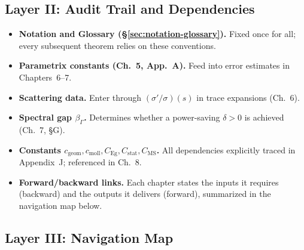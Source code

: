 \subsection*{Layer II: Audit Trail and Dependencies}

\begin{itemize}
  \item \textbf{Notation and Glossary (\S\ref{sec:notation-glossary}).}
  Fixed once for all; every subsequent theorem relies on these conventions.
  
  \item \textbf{Parametrix constants (Ch.~5, App.~A).}
  Feed into error estimates in Chapters~6--7.
  
  \item \textbf{Scattering data.}
  Enter through $(\sigma'/\sigma)(s)$ in trace expansions (Ch.~6).
  
  \item \textbf{Spectral gap $\beta_\Gamma$.}
  Determines whether a power-saving $\delta>0$ is achieved (Ch.~7, \S G).
  
  \item \textbf{Constants $c_{\mathrm{geom}},c_{\mathrm{moll}},C_{\mathrm{Eg}},C_{\mathrm{stat}},C_{\mathrm{MS}}$.}
  All dependencies explicitly traced in Appendix~J; referenced in Ch.~8.
  
  \item \textbf{Forward/backward links.}
  Each chapter states the inputs it requires (backward) and the outputs
  it delivers (forward), summarized in the navigation map below.
\end{itemize}

\subsection*{Layer III: Navigation Map}

